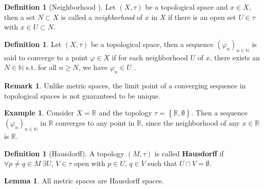 \documentclass[12pt, a4paper]{article}
\numberwithin{equation}{section}
\theoremstyle{definition}
\theoremstyle{definition}
\newtheorem{defn}[thm]{Definition} %
\newtheorem{exmp}[thm]{Example} %
\newtheorem{lemma}[thm]{Lemma} %
\newtheorem{remark}[thm]{Remark} %
\newcommand{\seq}[1][\varphi]{\left( #1 \right)_{n \in \mathbb{N}}}
\begin{document}
		\begin{defn}[Neighborhood \cite{topology-singh}]
			Let $(X, \tau)$ be a topological space and $x\in X$, then a set $N\subset X$ is called a \textit{neighborhood} of $x$ in $X$ if there is an open set $U\in\tau$ with $x\in U\subset N$.
		\end{defn}
		
		\begin{defn}
			Let $(X, \tau)$ be a topological space, then a sequence $\seq[\varphi_n]$ is said to converge to a point $\varphi\in X$ if for each neighborhood $U$ of $x$, there exists an $N\in\mathbb N$ s.t. for all $n\geq N$, we have $\varphi_n\in U$ \cite{289740}.
		\end{defn}
		
		\begin{remark}
			Unlike metric spaces, the limit point of a converging sequence in topological spaces is not guaranteed to be unique.
		\end{remark}
		
		\begin{exmp}
			Consider $X = \mathbb R$ and the topology $\tau = \left\{\mathbb R, \emptyset\right\}$. Then a sequence $\seq[\varphi_n]$ in $\mathbb R$ converges to any point in $\mathbb R$, since the neighborhood of any $x\in \mathbb R$ is $\mathbb R$.
		\end{exmp}
		
		\begin{defn}[Hausdorff]
			A topology $\left(M, \tau\right)$ is called \textbf{Hausdorff} if $\forall p\ne q \in M \ \exists U$, $V\in \tau$ open with $p\in U$, $q\in V$ such that $U\cap V = \emptyset$.  
		\end{defn} 
		
		\begin{lemma}
			All metric spaces are Hausdorff spaces. 
		\end{lemma}
		
\end{document}
